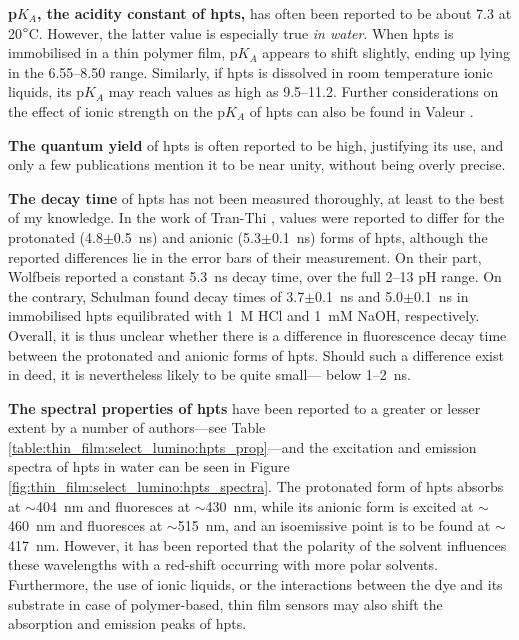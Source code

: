 \textbf{p$K_A$, the acidity constant of \gls{hpts},} has often been reported to be about 7.3 at 20$\degree$C. However, the latter value is especially true \emph{in water}. When \gls{hpts} is immobilised in a thin polymer film, p$K_A$ appears to shift slightly, ending up lying in the 6.55--8.50 range\cite{schulman1995, hakonen2008}. Similarly, if \gls{hpts} is dissolved in room temperature ionic liquids, its p$K_A$ may reach values as high as 9.5--11.2\cite{oter2006}. Further considerations on the effect of ionic strength on the p$K_A$ of \gls{hpts} can also be found in Valeur \etal{}\cite[p.~414]{valeur2012molecfluo}.

\textbf{The quantum yield} of \gls{hpts} is often reported to be high, justifying its use, and only a few publications mention it to be near unity, without being overly precise\cite{schulman1995, tranthi2002, kumar2018}.

\textbf{The decay time} of \gls{hpts} has not been measured thoroughly, at least to the best of my knowledge. In the work of Tran-Thi \etal{}\cite{tranthi2002}, values were reported to differ for the protonated (4.8$\pm$0.5~ns) and anionic (5.3$\pm$0.1~ns) forms of \gls{hpts}, although the reported differences lie in the error bars of their measurement. On their part, Wolfbeis \etal{}\cite{wolfbeis1983} reported a constant 5.3~ns decay time, over the full 2--13 pH range. On the contrary, Schulman \etal{}\cite{schulman1995} found decay times of 3.7$\pm$0.1~ns and 5.0$\pm$0.1~ns in immobilised \gls{hpts} equilibrated with 1~M HCl and 1~mM NaOH, respectively. Overall, it is thus unclear whether there is a difference in fluorescence decay time between the protonated and anionic forms of \gls{hpts}. Should such a difference exist in deed, it is nevertheless likely to be quite small---\ie{} below 1--2~ns. %

\textbf{The spectral properties of \gls{hpts}} have been reported to a greater or lesser extent by a number of authors---see Table \ref{table:thin_film:select_lumino:hpts_prop}---and the excitation and emission spectra of \gls{hpts} in water can be seen in Figure \ref{fig:thin_film:select_lumino:hpts_spectra}. The protonated form of \gls{hpts} absorbs at $\sim$404~nm and fluoresces at $\sim$430~nm, while its anionic form is excited at $\sim$460~nm and fluoresces at $\sim$515~nm, and an isoemissive point is to be found at $\sim$417~nm\cite{uttamlal1995, oter2008}. However, it has been reported that the polarity of the solvent influences these wavelengths with a red-shift occurring with more polar solvents\cite{barrash1998, tranthi2002}. Furthermore, the use of ionic liquids\cite{oter2006, oter2008}, or the interactions between the dye and its substrate in case of polymer-based, thin film sensors\cite{malins1998, chu2008, chu2009} may also shift the absorption and emission peaks of \gls{hpts}.

